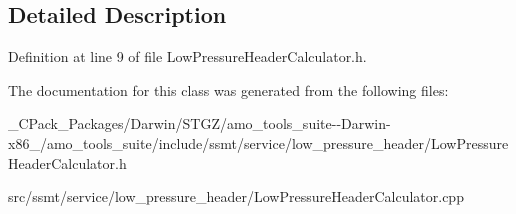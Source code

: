 \subsection{Detailed Description}


Definition at line 9 of file Low\+Pressure\+Header\+Calculator.\+h.



The documentation for this class was generated from the following files\+:\begin{DoxyCompactItemize}
\item 
\+\_\+\+C\+Pack\+\_\+\+Packages/\+Darwin/\+S\+T\+G\+Z/amo\+\_\+tools\+\_\+suite-\/-\/\+Darwin-\/x86\+\_/amo\+\_\+tools\+\_\+suite/include/ssmt/service/low\+\_\+pressure\+\_\+header/Low\+Pressure\+Header\+Calculator.\+h\item 
src/ssmt/service/low\+\_\+pressure\+\_\+header/Low\+Pressure\+Header\+Calculator.\+cpp\end{DoxyCompactItemize}
